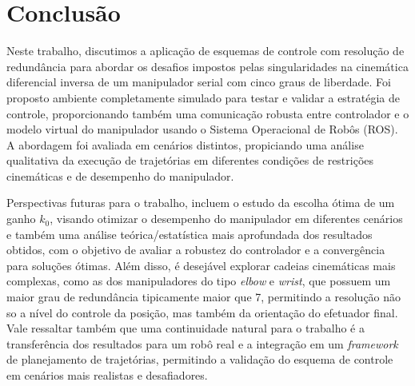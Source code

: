 \chapter{Conclusão}\label{cap:conclusao}

Neste trabalho, discutimos a aplicação de esquemas de controle com resolução de 
redundância para abordar os desafios impostos pelas singularidades na cinemática 
diferencial inversa de um manipulador serial com cinco graus de liberdade. Foi proposto ambiente completamente
simulado para testar e validar a estratégia de controle, proporcionando também uma comunicação robusta 
entre controlador e o modelo virtual do manipulador usando o Sistema Operacional de Robôs (ROS). 
A abordagem foi avaliada em cenários distintos, propiciando uma análise qualitativa da execução de
trajetórias em diferentes condições de restrições cinemáticas e de desempenho do manipulador.

Perspectivas futuras para o trabalho, incluem o estudo da escolha ótima de um ganho \(k_0\), visando otimizar 
o desempenho do manipulador em diferentes cenários e também uma análise teórica/estatística mais aprofundada dos resultados obtidos, com o objetivo de avaliar a robustez do
controlador e a convergência para soluções ótimas. Além disso, é desejável explorar cadeias cinemáticas 
mais complexas, como as dos manipuladores do tipo \emph{elbow} e \emph{wrist}, que possuem um maior 
grau de redundância tipicamente maior que 7, permitindo a resolução não so a nível do controle da posição, mas 
também da orientação do efetuador final. Vale ressaltar também que uma continuidade natural para o trabalho 
é a transferência dos resultados para um robô real e a integração em um \emph{framework} de planejamento de trajetórias, permitindo
a validação do esquema de controle em cenários mais realistas e desafiadores.